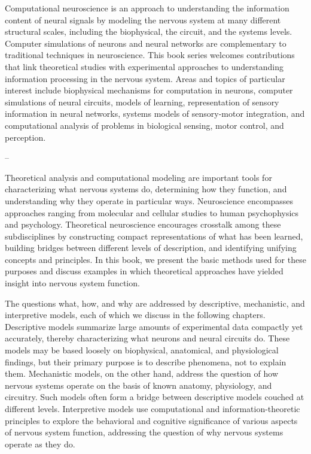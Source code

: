 Computational neuroscience is an approach to understanding the information content of neural signals by modeling the nervous system at many different structural scales, including the biophysical, the circuit, and the systems levels. Computer simulations of neurons and neural networks are complementary to traditional techniques in neuroscience. This book series welcomes contributions that link theoretical studies with experimental approaches to understanding information processing in the nervous system. Areas and topics of particular interest include biophysical mechanisms for computation in neurons, computer simulations of neural circuits, models of learning, representation of sensory information in neural networks, systems models of sensory-motor integration, and computational analysis of problems in biological sensing, motor control, and perception.

--

Theoretical analysis and computational modeling are important tools for characterizing what nervous systems do, determining how they function, and understanding why they operate in particular ways. Neuroscience encompasses approaches ranging from molecular and cellular studies to human psychophysics and psychology. Theoretical neuroscience encourages crosstalk among these subdisciplines by constructing compact representations of what has been learned, building bridges between different levels of description, and identifying unifying concepts and principles. In this book, we present the basic methods used for these purposes and discuss examples in which theoretical approaches have yielded insight into nervous system function.

The questions what, how, and why are addressed by descriptive, mechanistic, and interpretive models, each of which we discuss in the following chapters. Descriptive models summarize large amounts of experimental data compactly yet accurately, thereby characterizing what neurons and neural circuits do. These models may be based loosely on biophysical, anatomical, and physiological findings, but their primary purpose is to describe phenomena, not to explain them. Mechanistic models, on the other hand, address the question of how nervous systems operate on the basis of known anatomy, physiology, and circuitry. Such models often form a bridge between descriptive models couched at different levels. Interpretive models use computational and information-theoretic principles to explore the behavioral and cognitive significance of various aspects of nervous system function, addressing the question of why nervous systems operate as they do.

